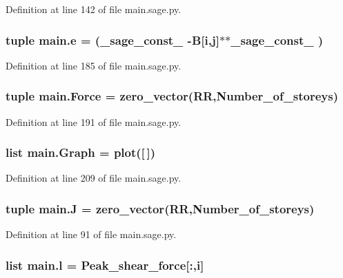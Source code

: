 Definition at line 142 of file main.\+sage.\+py.

\hypertarget{a00039_aa7f4fe671f919f7f067f9337ef9e02c0}{}
\subsubsection[{e}]{\setlength{\rightskip}{0pt plus 5cm}tuple main.\+e = (\+\_\+sage\+\_\+const\+\_ -\/{\bf B}\mbox{[}{\bf i},{\bf j}\mbox{]}$\ast$$\ast${\bf \+\_\+sage\+\_\+const\+\_} )}\label{a00039_aa7f4fe671f919f7f067f9337ef9e02c0}


Definition at line 185 of file main.\+sage.\+py.

\hypertarget{a00039_a4612305e50326c88dea04736a647c238}{}
\subsubsection[{Force}]{\setlength{\rightskip}{0pt plus 5cm}tuple main.\+Force = zero\+\_\+vector(R\+R,Number\+\_\+of\+\_\+storeys)}\label{a00039_a4612305e50326c88dea04736a647c238}


Definition at line 191 of file main.\+sage.\+py.

\hypertarget{a00039_ad40f6b3437e83a0385177ac65a317b97}{}
\subsubsection[{Graph}]{\setlength{\rightskip}{0pt plus 5cm}list main.\+Graph = plot(\mbox{[}$\,$\mbox{]})}\label{a00039_ad40f6b3437e83a0385177ac65a317b97}


Definition at line 209 of file main.\+sage.\+py.

\hypertarget{a00039_a00488f5887e168f7781b6fb94dd08518}{}
\subsubsection[{J}]{\setlength{\rightskip}{0pt plus 5cm}tuple main.\+J = zero\+\_\+vector(R\+R,Number\+\_\+of\+\_\+storeys)}\label{a00039_a00488f5887e168f7781b6fb94dd08518}


Definition at line 91 of file main.\+sage.\+py.

\hypertarget{a00039_a027916efc284622d928c1d8383917f6d}{}
\subsubsection[{l}]{\setlength{\rightskip}{0pt plus 5cm}list main.\+l = {\bf Peak\+\_\+shear\+\_\+force}\mbox{[}\+:,{\bf i}\mbox{]}}\label{a00039_a027916efc284622d928c1d8383917f6d}


